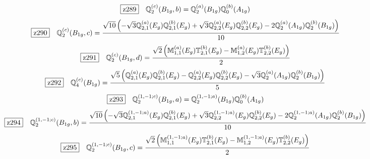 \documentclass[fleqn,10pt,landscape]{jsarticle}
\begin{document}
\begin{dmath*}
\hspace*{3mm}\fbox{z289}\quad \mathbb{Q}_{2}^{(c)}(B_{1g},b)=\mathbb{Q}_{2}^{(a)}(B_{1g}) \mathbb{Q}_{0}^{(b)}(A_{1g})
\end{dmath*}
\begin{dmath*}
\hspace*{3mm}\fbox{z290}\quad \mathbb{Q}_{2}^{(c)}(B_{1g},c)=\frac{\sqrt{10} \left(- \sqrt{3} \mathbb{Q}_{2,1}^{(a)}(E_{g}) \mathbb{Q}_{2,1}^{(b)}(E_{g}) + \sqrt{3} \mathbb{Q}_{2,2}^{(a)}(E_{g}) \mathbb{Q}_{2,2}^{(b)}(E_{g}) - 2 \mathbb{Q}_{2}^{(a)}(A_{1g}) \mathbb{Q}_{2}^{(b)}(B_{1g})\right)}{10}
\end{dmath*}
\begin{dmath*}
\hspace*{3mm}\fbox{z291}\quad \mathbb{Q}_{2}^{(c)}(B_{1g},d)=\frac{\sqrt{2} \left(\mathbb{M}_{1,1}^{(a)}(E_{g}) \mathbb{T}_{2,1}^{(b)}(E_{g}) - \mathbb{M}_{1,2}^{(a)}(E_{g}) \mathbb{T}_{2,2}^{(b)}(E_{g})\right)}{2}
\end{dmath*}
\begin{dmath*}
\hspace*{3mm}\fbox{z292}\quad \mathbb{Q}_{4}^{(c)}(B_{1g})=\frac{\sqrt{5} \left(\mathbb{Q}_{2,1}^{(a)}(E_{g}) \mathbb{Q}_{2,1}^{(b)}(E_{g}) - \mathbb{Q}_{2,2}^{(a)}(E_{g}) \mathbb{Q}_{2,2}^{(b)}(E_{g}) - \sqrt{3} \mathbb{Q}_{2}^{(a)}(A_{1g}) \mathbb{Q}_{2}^{(b)}(B_{1g})\right)}{5}
\end{dmath*}
\begin{dmath*}
\hspace*{3mm}\fbox{z293}\quad \mathbb{Q}_{2}^{(1,-1;c)}(B_{1g},a)=\mathbb{Q}_{2}^{(1,-1;a)}(B_{1g}) \mathbb{Q}_{0}^{(b)}(A_{1g})
\end{dmath*}
\begin{dmath*}
\hspace*{3mm}\fbox{z294}\quad \mathbb{Q}_{2}^{(1,-1;c)}(B_{1g},b)=\frac{\sqrt{10} \left(- \sqrt{3} \mathbb{Q}_{2,1}^{(1,-1;a)}(E_{g}) \mathbb{Q}_{2,1}^{(b)}(E_{g}) + \sqrt{3} \mathbb{Q}_{2,2}^{(1,-1;a)}(E_{g}) \mathbb{Q}_{2,2}^{(b)}(E_{g}) - 2 \mathbb{Q}_{2}^{(1,-1;a)}(A_{1g}) \mathbb{Q}_{2}^{(b)}(B_{1g})\right)}{10}
\end{dmath*}
\begin{dmath*}
\hspace*{3mm}\fbox{z295}\quad \mathbb{Q}_{2}^{(1,-1;c)}(B_{1g},c)=\frac{\sqrt{2} \left(\mathbb{M}_{1,1}^{(1,-1;a)}(E_{g}) \mathbb{T}_{2,1}^{(b)}(E_{g}) - \mathbb{M}_{1,2}^{(1,-1;a)}(E_{g}) \mathbb{T}_{2,2}^{(b)}(E_{g})\right)}{2}
\end{dmath*}
\end{document}
